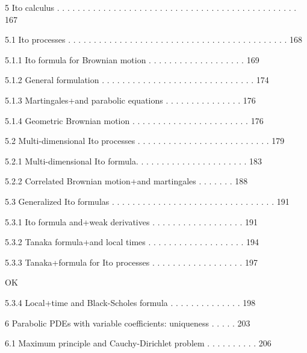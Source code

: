 5 Ito calculus . . . . . . . . . . . . . . . . . . . . . . . . . . . . . . . . . . . . . . . . . . . . . . . 167



5.1 Ito processes . . . . . . . . . . . . . . . . . . . . . . . . . . . . . . . . . . . . . . . . . . . 168



5.1.1 Ito formula for Brownian motion . . . . . . . . . . . . . . . . . . . 169



5.1.2 General formulation . . . . . . . . . . . . . . . . . . . . . . . . . . . . . . 174



5.1.3 Martingales+and parabolic equations . . . . . . . . . . . . . . . 176



5.1.4 Geometric Brownian motion . . . . . . . . . . . . . . . . . . . . . . . 176



5.2 Multi-dimensional Ito processes . . . . . . . . . . . . . . . . . . . . . . . . . . 179



5.2.1 Multi-dimensional Ito formula. . . . . . . . . . . . . . . . . . . . . . 183



5.2.2 Correlated Brownian motion+and martingales . . . . . . . 188



5.3 Generalized Ito formulas . . . . . . . . . . . . . . . . . . . . . . . . . . . . . . . . 191



5.3.1 Ito formula and+weak derivatives . . . . . . . . . . . . . . . . . . 191



5.3.2 Tanaka formula+and local times . . . . . . . . . . . . . . . . . . . 194



5.3.3 Tanaka+formula for Ito processes . . . . . . . . . . . . . . . . . . 197

OK

5.3.4 Local+time and Black-Scholes formula . . . . . . . . . . . . . . 198



6 Parabolic PDEs with variable coefficients: uniqueness . . . . . 203



6.1 Maximum principle and Cauchy-Dirichlet problem . . . . . . . . . . 206

